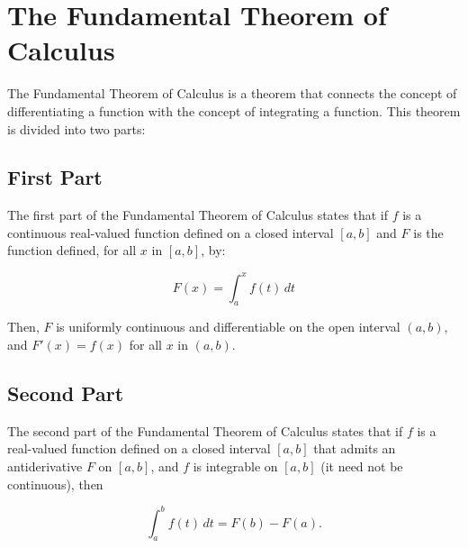 \chapter{The Fundamental Theorem of Calculus}

The Fundamental Theorem of Calculus is a theorem that connects the
concept of differentiating a function with the concept of integrating
a function. This theorem is divided into two parts:

\section{First Part}

The first part of the Fundamental Theorem of Calculus states that if
$f$ is a continuous real-valued function defined on a closed interval
$[a, b]$ and $F$ is the function defined, for all $x$ in $[a, b]$, by:

\begin{equation}
F(x) = \int_a^x f(t) \, dt
\end{equation}

Then, $F$ is uniformly continuous and differentiable on the open
interval $(a, b)$, and $F'(x) = f(x)$ for all $x$ in $(a, b)$.

\section{Second Part}

The second part of the Fundamental Theorem of Calculus states that if
$f$ is a real-valued function defined on a closed interval $[a, b]$
that admits an antiderivative $F$ on $[a, b]$, and $f$ is integrable
on $[a, b]$ (it need not be continuous), then

\begin{equation}
\int_a^b f(t) \, dt = F(b) - F(a).
\end{equation}
